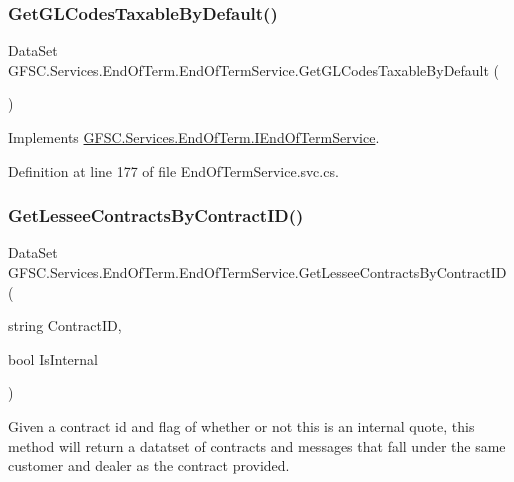 \subsubsection{\texorpdfstring{Get\+G\+L\+Codes\+Taxable\+By\+Default()}{GetGLCodesTaxableByDefault()}}
{\footnotesize\ttfamily Data\+Set G\+F\+S\+C.\+Services.\+End\+Of\+Term.\+End\+Of\+Term\+Service.\+Get\+G\+L\+Codes\+Taxable\+By\+Default (\begin{DoxyParamCaption}{ }\end{DoxyParamCaption})}



Implements \mbox{\hyperlink{interface_g_f_s_c_1_1_services_1_1_end_of_term_1_1_i_end_of_term_service_a8b6ecde00a9c6c73a5d3b1cdb63dd98a}{G\+F\+S\+C.\+Services.\+End\+Of\+Term.\+I\+End\+Of\+Term\+Service}}.



Definition at line 177 of file End\+Of\+Term\+Service.\+svc.\+cs.

\mbox{\label{class_g_f_s_c_1_1_services_1_1_end_of_term_1_1_end_of_term_service_aa6e8a43d03024b195fa9c6eaa4411fce}} 
\subsubsection{\texorpdfstring{Get\+Lessee\+Contracts\+By\+Contract\+I\+D()}{GetLesseeContractsByContractID()}}
{\footnotesize\ttfamily Data\+Set G\+F\+S\+C.\+Services.\+End\+Of\+Term.\+End\+Of\+Term\+Service.\+Get\+Lessee\+Contracts\+By\+Contract\+ID (\begin{DoxyParamCaption}\item[{string}]{Contract\+ID,  }\item[{bool}]{Is\+Internal }\end{DoxyParamCaption})}



Given a contract id and flag of whether or not this is an internal quote, this method will return a datatset of contracts and messages that fall under the same customer and dealer as the contract provided. 


